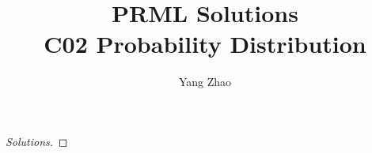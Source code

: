 \documentclass[12pt,a4paper]{article}
\title{PRML Solutions\\C02 Probability Distribution}
\author{Yang Zhao}
\affil{Department of Automation, Tsinghua Unversity}
\date{}
\newenvironment{exercise}[2][Ex]{\begin{trivlist}
\item[\hskip \labelsep {\bfseries #1}\hskip \labelsep {\bfseries #2.}]}{\end{trivlist}}
\begin{document}
 
\maketitle
 
\begin{exercise}{2.1(*)} %
    \begin{proof}[Solutions]
        
    \end{proof}
\end{exercise}
\end{document}
